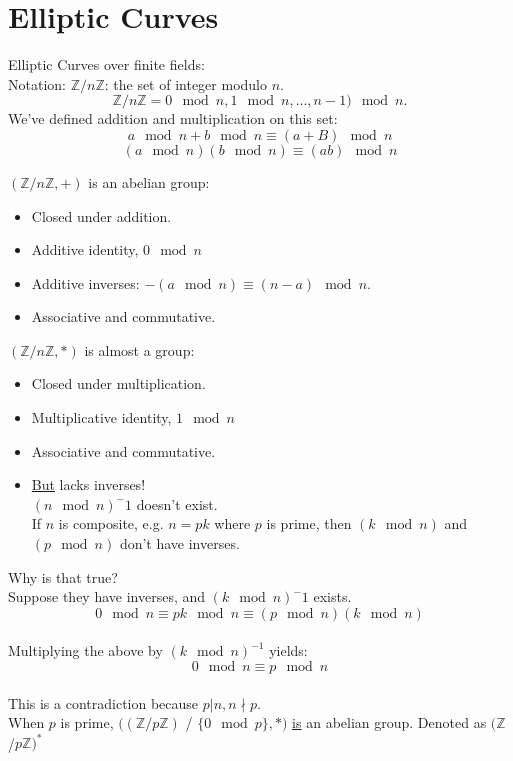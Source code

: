 \section{Elliptic Curves}
Elliptic Curves over finite fields:
\\Notation: $\mathbb{Z} / n \mathbb{Z}$: the set of integer modulo $n$.
$$\mathbb{Z} / n \mathbb{Z}={0\mod{n}, 1\mod{n},..., n-1)\mod{n}}.$$
We've defined addition and multiplication on this set:
$$a\mod{n}+b\mod{n}\equiv(a+B)\mod{n}$$
$$(a\mod{n})(b\mod{n})\equiv(ab)\mod{n}$$

$(\mathbb{Z} / n \mathbb{Z}, +)$ is an abelian group:
\begin{itemize}
\item Closed under addition.
\item Additive identity, $0\mod{n}$
\item Additive inverses: $-(a\mod{n})\equiv(n-a)\mod{n}$.
\item Associative and commutative. 
\end{itemize}

$(\mathbb{Z} / n \mathbb{Z}, *)$ is almost a group:
\begin{itemize}
\item Closed under multiplication.
\item Multiplicative identity, $1\mod{n}$
\item Associative and commutative.
\item \underline{But} lacks inverses!\\
\indent $(n\mod{n})^-1$ doesn't exist.\\
\indent If $n$ is composite, e.g. $n=pk$ where $p$ is prime, then $(k\mod{n})$ and $(p\mod{n})$ don't have inverses.
\end{itemize}

Why is that true?\\
\indent Suppose they have inverses, and $(k\mod{n})^-1$ exists. 
$$0\mod{n}\equiv pk\mod{n} \equiv (p\mod{n})(k\mod{n})$$
\\Multiplying the above by $(k\mod{n})^{-1}$ yields:
$$0\mod{n}\equiv p\mod{n}$$
\\This is a contradiction because $p|n, n\nmid p$.\\

When $p$ is prime, $((\mathbb{Z} / p \mathbb{Z})$ / $\{0\mod{p}\}, *)$ \underline{is} an abelian group. Denoted as $(\mathbb{Z}$/$p\mathbb{Z})^*$\\


